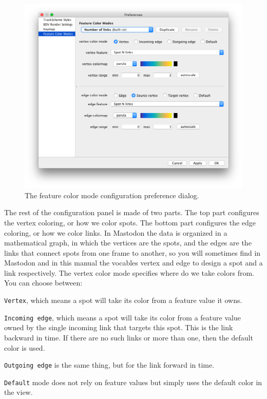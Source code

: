\begin{figure}
    \centering
    \includegraphics[height=0.3\textheight]{figures/Mastodon_FeatureColorModeConfig_1.png}
    
    \caption{The feature color mode configuration preference dialog. }
    \label{fig:FeatureColorModeConfig1}
\end{figure}

The rest of the configuration panel is made of two parts.
The top part configures the vertex coloring, or how we color spots.
The bottom part configures the edge coloring, or how we color links. 
In Mastodon the data is organized in a mathematical graph, in which the vertices are the spots, and the edges are the links that connect spots from one frame to another, so you will sometimes find in Mastodon and in this manual the vocables vertex and edge to design a spot and a link respectively. 
The vertex color mode specifies where do we take colors from. 
You can choose between:
\begin{myitemize}
    \item \texttt{Vertex}, which means a spot will take its color from a feature value it owns.
    \item \texttt{Incoming edge}, which means a spot will take its color from a feature value owned by the single incoming link that targets this spot. This is the link backward in time. If there are no such links or more than one, then the default color is used.
    \item \texttt{Outgoing edge} is the same thing, but for the link forward in time. 
    \item \texttt{Default} mode does not rely on feature values but simply uses the default color in the view.
\end{myitemize}

